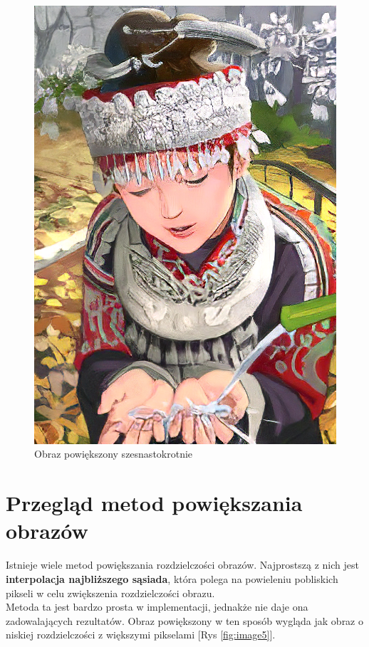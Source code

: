 \begin{figure}[ht]
\begin{minipage}[t]{0.3\linewidth}
        \includegraphics[width=\linewidth]{Rozdziały/02.Podstawy_teoretyczne/comic_ESRGAN_x16.png}
        \caption{Obraz powiększony szesnastokrotnie}
        \label{fig:image3}
    \end{minipage}
  \end{figure}


\section{Przegląd metod powiększania obrazów}


Istnieje wiele metod powiększania rozdzielczości obrazów. Najprostszą z nich jest \textbf{interpolacja najbliższego sąsiada}, która polega na powieleniu pobliskich pikseli w celu zwiększenia rozdzielczości obrazu. \\
Metoda ta jest bardzo prosta w implementacji, jednakże nie daje ona zadowalających rezultatów. Obraz powiększony w ten sposób wygląda jak obraz o niskiej rozdzielczości z większymi pikselami [Rys \ref{fig:image5}]. 


